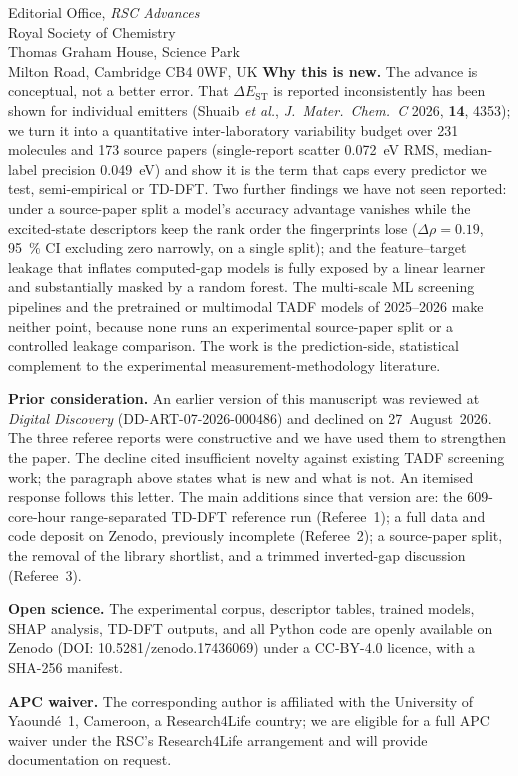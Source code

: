 \documentclass[12pt,a4paper]{letter}
\begin{document}
\begin{letter}{
  Editorial Office, \textit{RSC Advances}\\
  Royal Society of Chemistry\\
  Thomas Graham House, Science Park\\
  Milton Road, Cambridge CB4 0WF, UK
}
\textbf{Why this is new.}
The advance is conceptual, not a better error. That $\Delta E_\text{ST}$ is reported
inconsistently has been shown for individual emitters (Shuaib \textit{et al.},
\textit{J.~Mater.~Chem.~C} 2026, \textbf{14}, 4353); we turn it into a quantitative
inter-laboratory variability budget over \num{231} molecules and \num{173} source
papers (single-report scatter \num{0.072}~eV RMS, median-label precision
\num{0.049}~eV) and show it is the term that caps every predictor we test,
semi-empirical or TD-DFT. Two further findings we have not seen reported: under a
source-paper split a model's accuracy advantage vanishes while the excited-state
descriptors keep the rank order the fingerprints lose ($\Delta\rho = \num{0.19}$,
\qty{95}{\percent} CI excluding zero narrowly, on a single split); and the
feature--target leakage that inflates computed-gap models is fully exposed by a linear
learner and substantially masked by a random forest. The multi-scale ML screening
pipelines and the pretrained or multimodal TADF models of 2025--2026 make neither
point, because none runs an experimental source-paper split or a controlled leakage
comparison. The work is the prediction-side, statistical complement to the
experimental measurement-methodology literature.

\textbf{Prior consideration.}
An earlier version of this manuscript was reviewed at \textit{Digital Discovery}
(DD-ART-07-2026-000486) and declined on 27~August~2026. The three referee reports
were constructive and we have used them to strengthen the paper. The decline cited
insufficient novelty against existing TADF screening work; the paragraph above states
what is new and what is not. An itemised response follows this letter. The main additions since that version are: the
\num{609}-core-hour range-separated TD-DFT reference run (Referee~1); a full data
and code deposit on Zenodo, previously incomplete (Referee~2); a source-paper
split, the removal of the library shortlist, and a trimmed
inverted-gap discussion (Referee~3).

\textbf{Open science.}
The experimental corpus, descriptor tables, trained models, SHAP analysis, TD-DFT
outputs, and all Python code are openly available on Zenodo
(DOI: 10.5281/zenodo.17436069) under a CC-BY-4.0 licence, with a SHA-256 manifest.

\textbf{APC waiver.}
The corresponding author is affiliated with the University of Yaound\'{e}~1,
Cameroon, a Research4Life country; we are eligible for a full APC waiver under the
RSC's Research4Life arrangement and will provide documentation on request.


\end{letter}
\end{document}
